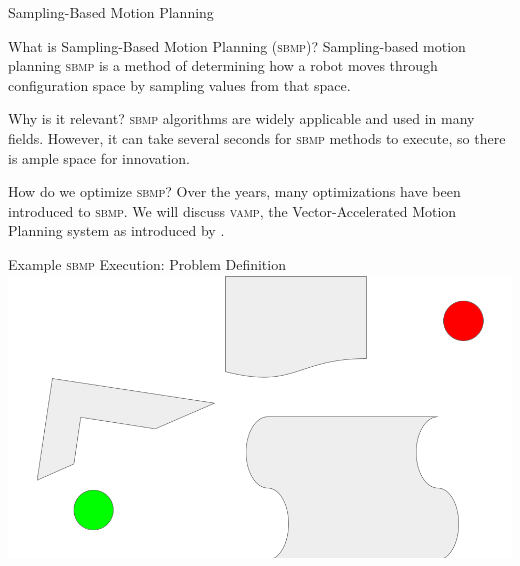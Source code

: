 \documentclass{beamer}
\begin{document}
\begin{frame}{Sampling-Based Motion Planning}

\pause
\begin{block}{What is Sampling-Based Motion Planning (\textsc{sbmp})?}
Sampling-based motion planning \textsc{sbmp} is a method of determining how a robot moves through configuration space by sampling values from that space. %
\end{block}

\pause
\begin{block}{Why is it relevant?} 
\textsc{sbmp} algorithms are widely applicable and used in many fields. %
However, it can take several seconds for \textsc{sbmp} methods to execute, so there is ample space for innovation.
\end{block}

\pause
\begin{block}{How do we optimize \textsc{sbmp}?}
Over the years, many optimizations have been introduced to \textsc{sbmp}. We will discuss \textsc{vamp}, the Vector-Accelerated Motion Planning system as introduced by \cite{paper:MiM}.
\end{block}
\end{frame}

\begin{frame}{Example \textsc{sbmp} Execution: Problem Definition}
\includegraphics[width=\textwidth]{./assets/rrt_slides/rrt_slides_2.png}
\end{frame}
\end{document}
